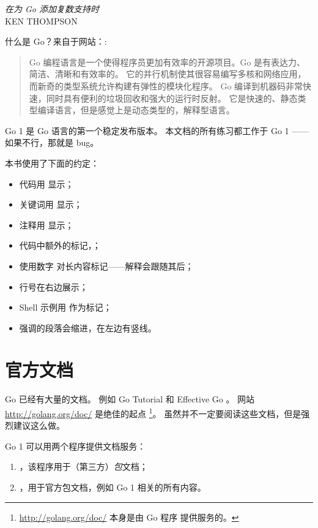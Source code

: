 {\textit{在为 Go 添加复数支持时}\\ \textsc{KEN THOMPSON}}

\noindent{}什么是 Go？来自于网站：\cite{go_web}:
\begin{quote}
Go 编程语言是一个使得程序员更加有效率的开源项目。Go 是有表达力、简洁、清晰和有效率的。
它的并行机制使其很容易编写多核和网络应用，而新奇的类型系统允许构建有弹性的模块化程序。
Go 编译到机器码非常快速，同时具有便利的垃圾回收和强大的运行时反射。
它是快速的、静态类型编译语言，但是感觉上是动态类型的，解释型语言。
\end{quote}

Go 1 是 Go 语言的第一个稳定发布版本。
本文档的所有练习都工作于 Go 1 —— 如果不行，那就是 bug。

本书使用了下面的约定：
\begin{itemize}
\item 代码用  显示；
\item 关键词用  显示；
\item 注释用  显示；
\item 代码中额外的标记，；
\item 使用数字  对长内容标记——解释会跟随其后；
\item 行号在右边展示；
\item Shell 示例用 \pr{} 作为标记；
\item 强调的段落会缩进，在左边有竖线。
\end{itemize}

\section{官方文档}
Go 已经有大量的文档。
例如 Go Tutorial \cite{go_tutorial} 和 Effective Go \cite{effective_go}。
网站 \url{http://golang.org/doc/} 是绝佳的起点 
\footnote{\url{http://golang.org/doc/} 本身是由 Go 程序  提供服务的。}。
虽然并不一定要阅读这些文档，但是强烈建议这么做。

Go 1 可以用两个程序提供文档服务：
\begin{enumerate}
\item {}，该程序用于（第三方）\emph{包}文档；
\item {}，用于官方包文档，例如 Go 1 相关的所有内容。
\end{enumerate}

